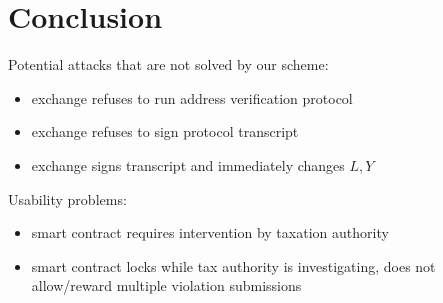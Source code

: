 \section{Conclusion}\label{sec:conclusion}

Potential attacks that are not solved by our scheme:
\begin{itemize}
    \item exchange refuses to run address verification protocol
    \item exchange refuses to sign protocol transcript
    \item exchange signs transcript and immediately changes $L, Y$ 
\end{itemize}

Usability problems:
\begin{itemize}
    \item smart contract requires intervention by taxation authority
    \item smart contract locks while tax authority is investigating, does not allow/reward multiple violation submissions
\end{itemize}
